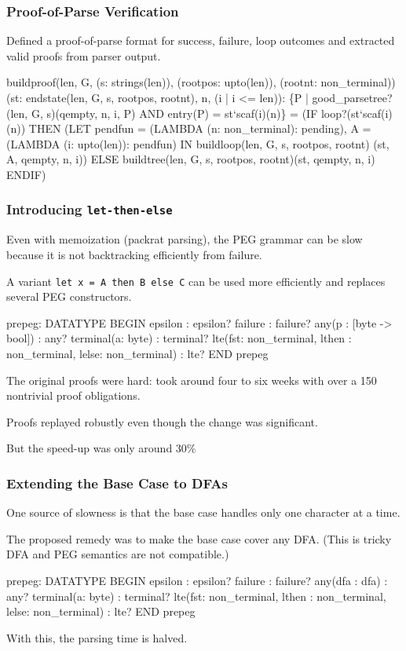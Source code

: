 \documentclass[xcolor=dvipsnames]{beamer}
\begin{document}
\begin{frame}[fragile]
\frametitle{Proof-of-Parse Verification    }
    Defined a proof-of-parse format for success, failure, loop outcomes and extracted valid proofs from parser output.
\begin{smallersession}
  buildproof(len, G, (s: strings(len)),
              (rootpos: upto(len)), (rootnt: non_terminal))
            (st: endstate(len, G, s, rootpos, rootnt),
              n, (i | i <= len)): 
     \{P | good_parsetree?(len, G, s)(qempty, n, i, P)
           AND entry(P) = st`scaf(i)(n)\}
  = (IF loop?(st`scaf(i)(n))
     THEN  (LET pendfun = (LAMBDA (n: non_terminal): pending),
                      A = (LAMBDA (i: upto(len)): pendfun)
             IN buildloop(len, G, s, rootpos, rootnt)
                         (st, A, qempty, n, i))
     ELSE buildtree(len, G, s, rootpos, rootnt)(st, qempty, n, i)
     ENDIF)

    \end{smallersession}

\end{frame}


\begin{frame}[fragile]
\frametitle{Introducing \texttt{let-then-else}}
    Even with memoization (packrat parsing), the PEG grammar can be slow because it is not backtracking efficiently from failure.


    A variant \texttt{let x = A then B else C} can be used more efficiently and replaces several PEG constructors.
    \begin{smallersession}
prepeg: DATATYPE
BEGIN
   epsilon : epsilon?
   failure : failure?
   any(p : [byte -> bool]) : any?
   terminal(a: byte) : terminal?
   lte(fst: non_terminal, lthen : non_terminal, lelse: non_terminal)
     : lte? 
END prepeg

    \end{smallersession}

    The original proofs were hard: took around four to six weeks with over a 150 nontrivial proof obligations.  

    Proofs replayed robustly even though the change was significant.

    But the speed-up was only around 30\%

\end{frame}


\begin{frame}[fragile]
\frametitle{Extending the Base Case to DFAs}
    One source of slowness is that the base case handles only one character at a time.

    The proposed remedy was to make the base case cover any DFA.
    (This is tricky DFA and PEG semantics are not compatible.)

    \begin{smallersession}
prepeg: DATATYPE
BEGIN
   epsilon : epsilon?
   failure : failure?
   any(dfa : dfa) : any?
   terminal(a: byte) : terminal?
   lte(fst: non_terminal, lthen : non_terminal, lelse: non_terminal)
     : lte? 
END prepeg
\end{smallersession}

With this, the parsing time is halved.

\end{frame}
\end{document}
